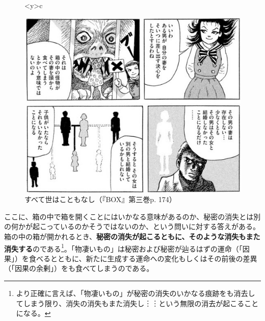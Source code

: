\documentclass[b5j,twoside,twocolumn]{utarticle}
\begin{document}
\begin{figure}[h]
\begin{tabular}<y>{c}
\begin{minipage}[c]{0.65\hsize}
	\centering
	\includegraphics[clip, scale=0.4]{因果}
	\caption{すべて世はこともなし（『BOX』第三巻p. 174）}
	\end{minipage}
\end{tabular}
\end{figure}

ここに、箱の中で箱を開くことにはいかなる意味があるのか、秘密の消失とは別の何かが起こっているのかそうではないのか、という問いに対する答えがある。箱の中の箱が開かれるとき、\textbf{秘密の消失が起こるともに、そのような消失もまた消失する}のである\footnote{より正確に言えば、「物凄いもの」が秘密の消失のいかなる痕跡をも消去してしまう限り、消失の消失もまた消失し︙︙という無限の消去が起こることになる。}。「物凄いもの」は秘密および秘密が辿るはずの運命（「因果」）を食べるとともに、新たに生成する運命への変化もしくはその前後の差異（「因果の余剰」）をも食べてしまうのである。
\end{document}
